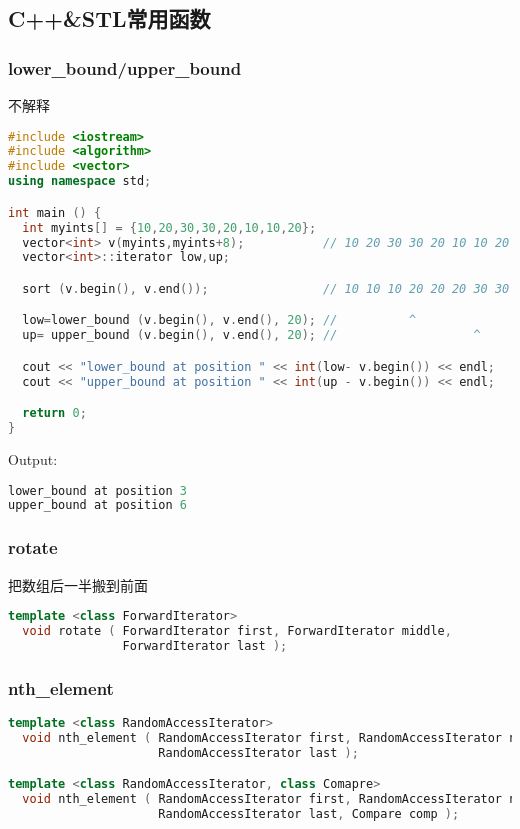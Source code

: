 \subsection{C++\&STL常用函数}
    \subsubsection{lower\_bound/upper\_bound}
	不解释\\
	\begin{lstlisting}[language=c++]
#include <iostream>
#include <algorithm>
#include <vector>
using namespace std;

int main () {
  int myints[] = {10,20,30,30,20,10,10,20};
  vector<int> v(myints,myints+8);           // 10 20 30 30 20 10 10 20
  vector<int>::iterator low,up;

  sort (v.begin(), v.end());                // 10 10 10 20 20 20 30 30

  low=lower_bound (v.begin(), v.end(), 20); //          ^
  up= upper_bound (v.begin(), v.end(), 20); //                   ^

  cout << "lower_bound at position " << int(low- v.begin()) << endl;
  cout << "upper_bound at position " << int(up - v.begin()) << endl;

  return 0;
}
	\end{lstlisting}
	Output:\\
	\begin{lstlisting}[language=c++]
lower_bound at position 3
upper_bound at position 6
	\end{lstlisting}
	
    \subsubsection{rotate}
	把数组后一半搬到前面\\
	\begin{lstlisting}[language=c++]
template <class ForwardIterator>
  void rotate ( ForwardIterator first, ForwardIterator middle,
                ForwardIterator last );
	\end{lstlisting}
	
    \subsubsection{nth\_element}
	\begin{lstlisting}[language=c++]
template <class RandomAccessIterator>
  void nth_element ( RandomAccessIterator first, RandomAccessIterator nth,
                     RandomAccessIterator last );

template <class RandomAccessIterator, class Comapre>
  void nth_element ( RandomAccessIterator first, RandomAccessIterator nth,
                     RandomAccessIterator last, Compare comp );
	\end{lstlisting}
	
